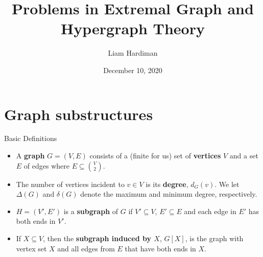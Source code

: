 \documentclass{beamer}
\title{Problems in Extremal Graph and Hypergraph Theory}
\author{Liam Hardiman}
\date{December 10, 2020}
\theoremstyle{plain}
\begin{document}
\maketitle



\section{Graph substructures}

	\begin{frame}{Basic Definitions}
		\begin{itemize}
			\item A \textbf{graph} $G = (V, E)$ consists of a (finite for us) set of \textbf{vertices} $V$ and a set $E$ of edges where $E\subseteq \binom{V}{2}$.

			\pause

			\item The number of vertices incident to $v\in V$ is its \textbf{degree}, $d_G(v)$.
			We let $\Delta(G)$ and $\delta(G)$ denote the maximum and minimum degree, respectively.

			\pause

			\item $H = (V', E')$ is a \textbf{subgraph} of $G$ if $V'\subseteq V$, $E'\subseteq E$ and each edge in $E'$ has both ends in $V'$.

			\pause


			\item If $X\subseteq V$, then the \textbf{subgraph induced by $X$}, $G[X]$, is the graph with vertex set $X$ and all edges from $E$ that have both ends in $X$.


		\end{itemize}
	\end{frame}
\end{document}
